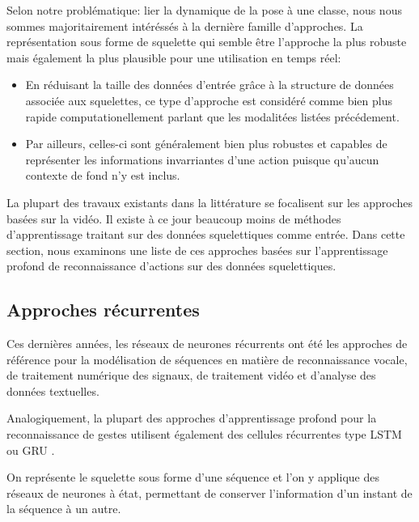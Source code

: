 Selon notre problématique: lier la dynamique de la pose à une classe, nous nous sommes majoritairement intéréssés à la dernière famille d'approches. La représentation sous forme de squelette qui semble être l'approche la plus robuste mais également la plus plausible pour une utilisation en temps réel:

\begin{itemize}
    \item En réduisant la taille des données d'entrée grâce à la structure de données associée aux squelettes, ce type d'approche est considéré comme bien plus rapide computationellement parlant que les modalitées listées précédement.
    \item Par ailleurs, celles-ci sont généralement bien plus robustes et capables de représenter les informations invarriantes d'une action puisque qu'aucun contexte de fond n'y est inclus.
\end{itemize}

La plupart des travaux existants dans la littérature se focalisent sur les approches basées sur la vidéo. Il existe à ce jour beaucoup moins de méthodes d'apprentissage traitant sur des données squelettiques comme entrée. Dans cette section, nous examinons une liste de ces approches basées sur l'apprentissage profond de reconnaissance d'actions sur des données squelettiques.

\subsection{Approches récurrentes}

Ces dernières années, les réseaux de neurones récurrents ont  été les approches de référence pour la modélisation de séquences en matière de reconnaissance vocale, de traitement numérique des signaux, de traitement vidéo et d'analyse des données textuelles. 


Analogiquement, la plupart des approches d'apprentissage profond pour la reconnaissance de gestes utilisent également des cellules récurrentes type LSTM\\ \cite{hochreiter1997long} ou GRU \cite{2014arXiv1406.1078C}.

On représente le squelette sous forme d’une séquence et l'on y applique des réseaux de neurones à état, permettant de conserver l’information d’un instant de la séquence à un autre.


